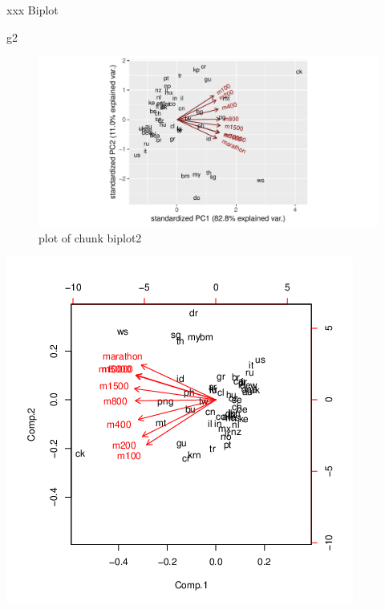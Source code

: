 \documentclass[ignorenonframetext,]{beamer}
\newenvironment{Shaded}{\begin{snugshade}}{\end{snugshade}}
\newcommand{\NormalTok}[1]{#1}
\begin{document}
\begin{frame}[fragile]{xxx Biplot}
\protect\hypertarget{xxx-biplot}{}

\begin{Shaded}
\begin{Highlighting}[]
\NormalTok{g2}
\end{Highlighting}
\end{Shaded}

\begin{figure}
\centering
\includegraphics{figure/biplot2-1.pdf}
\caption{plot of chunk biplot2}
\end{figure}

\includegraphics{bPrincomp-biplot.png}

\end{frame}
\end{document}
